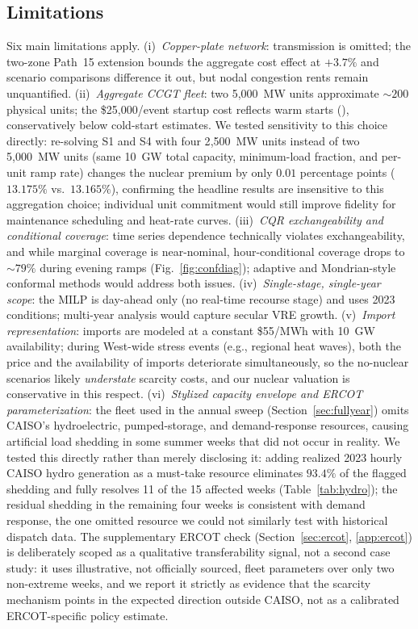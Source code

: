\documentclass[preprint,12pt,authoryear]{elsarticle}
\begin{document}
\subsection{Limitations}

Six main limitations apply. (i)~\emph{Copper-plate network}: transmission is omitted; the two-zone Path~15 extension bounds the aggregate cost effect at $+3.7\%$ and scenario comparisons difference it out, but nodal congestion rents remain unquantified. (ii)~\emph{Aggregate CCGT fleet}: two 5{,}000~MW units approximate ${\sim}200$ physical units; the \$25{,}000/event startup cost reflects warm starts (\citealp{nrelatb2023}), conservatively below cold-start estimates. We tested sensitivity to this choice directly: re-solving S1 and S4 with four 2{,}500~MW units instead of two 5{,}000~MW units (same 10~GW total capacity, minimum-load fraction, and per-unit ramp rate) changes the nuclear premium by only $0.01$ percentage points ($13.175\%$ vs.\ $13.165\%$), confirming the headline results are insensitive to this aggregation choice; individual unit commitment would still improve fidelity for maintenance scheduling and heat-rate curves. (iii)~\emph{CQR exchangeability and conditional coverage}: time series dependence technically violates exchangeability, and while marginal coverage is near-nominal, hour-conditional coverage drops to ${\sim}79\%$ during evening ramps (Fig.~\ref{fig:confdiag}); adaptive and Mondrian-style conformal methods \citep{gibbs2021,zaffran2022} would address both issues. (iv)~\emph{Single-stage, single-year scope}: the MILP is day-ahead only (no real-time recourse stage) and uses 2023 conditions; multi-year analysis would capture secular VRE growth. (v)~\emph{Import representation}: imports are modeled at a constant \$55/MWh with 10~GW availability; during West-wide stress events (e.g., regional heat waves), both the price and the availability of imports deteriorate simultaneously, so the no-nuclear scenarios likely \emph{understate} scarcity costs, and our nuclear valuation is conservative in this respect. (vi)~\emph{Stylized capacity envelope and ERCOT parameterization}: the fleet used in the annual sweep (Section~\ref{sec:fullyear}) omits CAISO's hydroelectric, pumped-storage, and demand-response resources, causing artificial load shedding in some summer weeks that did not occur in reality. We tested this directly rather than merely disclosing it: adding realized 2023 hourly CAISO hydro generation as a must-take resource eliminates $93.4\%$ of the flagged shedding and fully resolves 11 of the 15 affected weeks (Table~\ref{tab:hydro}); the residual shedding in the remaining four weeks is consistent with demand response, the one omitted resource we could not similarly test with historical dispatch data. The supplementary ERCOT check (Section~\ref{sec:ercot}, \ref{app:ercot}) is deliberately scoped as a qualitative transferability signal, not a second case study: it uses illustrative, not officially sourced, fleet parameters over only two non-extreme weeks, and we report it strictly as evidence that the scarcity mechanism points in the expected direction outside CAISO, not as a calibrated ERCOT-specific policy estimate.
\end{document}
